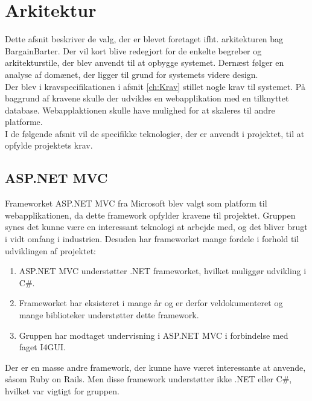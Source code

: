 \chapter{Arkitektur}
Dette afsnit beskriver de valg, der er blevet foretaget ifht. arkitekturen bag BargainBarter. Der vil kort blive redegjort for de enkelte begreber og arkitekturstile, der blev anvendt til at opbygge systemet. Dernæst følger en analyse af domænet, der ligger til grund for systemets videre design. \\ 

\noindent Der blev i kravspecifikationen i afsnit \ref{ch:Krav} stillet nogle krav til systemet. På baggrund af kravene skulle der udvikles en webapplikation med en tilknyttet database. Webapplaktionen skulle have mulighed for at skaleres til andre platforme. \\

\noindent I de følgende afsnit vil de specifikke teknologier, der er anvendt i projektet, til at opfylde projektets krav.

\section{ASP.NET MVC}
Frameworket ASP.NET MVC\cite{MVC} fra Microsoft blev valgt som platform til webapplikationen, da dette framework opfylder kravene til projektet. Gruppen synes det kunne være en interessant teknologi at arbejde med, og det bliver brugt i vidt omfang i industrien. Desuden har frameworket mange fordele i forhold til udviklingen af projektet: 
\begin{enumerate}
	\item ASP.NET MVC understøtter .NET frameworket, hvilket muliggør udvikling i C\#.
	\item Frameworket har eksisteret i mange år og er derfor veldokumenteret og mange biblioteker understøtter dette framework.
	\item Gruppen har modtaget undervisning i ASP.NET MVC i forbindelse med faget I4GUI.
\end{enumerate}
Der er en masse andre framework, der kunne have været interessante at anvende, såsom Ruby on Rails. Men disse framework understøtter ikke .NET eller C\#, hvilket var vigtigt for gruppen. \\


